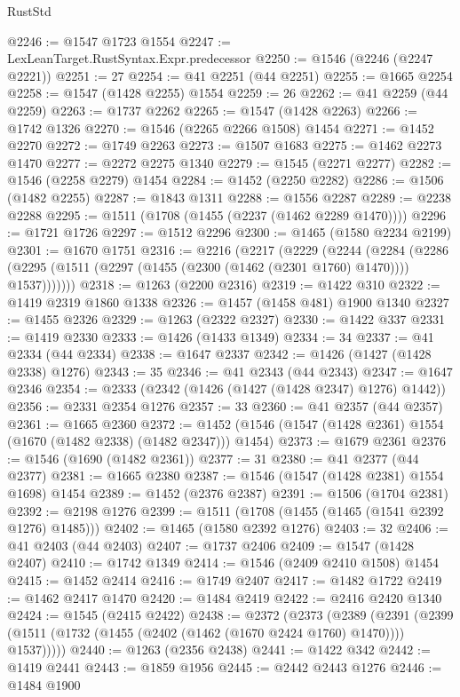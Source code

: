 \begin{lexlean}{RustStd}
\begin{coremodule}
@2246 := @1547 @1723 @1554
@2247 := LexLeanTarget.RustSyntax.Expr.predecessor
@2250 := @1546 (@2246 (@2247 @2221))
@2251 := 27
@2254 := @41 @2251 (@44 @2251)
@2255 := @1665 @2254
@2258 := @1547 (@1428 @2255) @1554
@2259 := 26
@2262 := @41 @2259 (@44 @2259)
@2263 := @1737 @2262
@2265 := @1547 (@1428 @2263)
@2266 := @1742 @1326
@2270 := @1546 (@2265 @2266 @1508) @1454
@2271 := @1452 @2270
@2272 := @1749 @2263
@2273 := @1507 @1683
@2275 := @1462 @2273 @1470
@2277 := @2272 @2275 @1340
@2279 := @1545 (@2271 @2277)
@2282 := @1546 (@2258 @2279) @1454
@2284 := @1452 (@2250 @2282)
@2286 := @1506 (@1482 @2255)
@2287 := @1843 @1311
@2288 := @1556 @2287
@2289 := @2238 @2288
@2295 := @1511 (@1708 (@1455 (@2237 (@1462 @2289 @1470))))
@2296 := @1721 @1726
@2297 := @1512 @2296
@2300 := @1465 (@1580 @2234 @2199)
@2301 := @1670 @1751
@2316 := @2216
    (@2217
      (@2229
        (@2244
          (@2284
            (@2286 (@2295 (@1511 (@2297 (@1455 (@2300 (@1462 (@2301 @1760) @1470)))) @1537)))))))
@2318 := @1263 (@2200 @2316)
@2319 := @1422 @310
@2322 := @1419 @2319 @1860 @1338
@2326 := @1457 (@1458 @481) @1900 @1340
@2327 := @1455 @2326
@2329 := @1263 (@2322 @2327)
@2330 := @1422 @337
@2331 := @1419 @2330
@2333 := @1426 (@1433 @1349)
@2334 := 34
@2337 := @41 @2334 (@44 @2334)
@2338 := @1647 @2337
@2342 := @1426 (@1427 (@1428 @2338) @1276)
@2343 := 35
@2346 := @41 @2343 (@44 @2343)
@2347 := @1647 @2346
@2354 := @2333 (@2342 (@1426 (@1427 (@1428 @2347) @1276) @1442))
@2356 := @2331 @2354 @1276
@2357 := 33
@2360 := @41 @2357 (@44 @2357)
@2361 := @1665 @2360
@2372 := @1452 (@1546 (@1547 (@1428 @2361) @1554 (@1670 (@1482 @2338) (@1482 @2347))) @1454)
@2373 := @1679 @2361
@2376 := @1546 (@1690 (@1482 @2361))
@2377 := 31
@2380 := @41 @2377 (@44 @2377)
@2381 := @1665 @2380
@2387 := @1546 (@1547 (@1428 @2381) @1554 @1698) @1454
@2389 := @1452 (@2376 @2387)
@2391 := @1506 (@1704 @2381)
@2392 := @2198 @1276
@2399 := @1511 (@1708 (@1455 (@1465 (@1541 @2392 @1276) @1485)))
@2402 := @1465 (@1580 @2392 @1276)
@2403 := 32
@2406 := @41 @2403 (@44 @2403)
@2407 := @1737 @2406
@2409 := @1547 (@1428 @2407)
@2410 := @1742 @1349
@2414 := @1546 (@2409 @2410 @1508) @1454
@2415 := @1452 @2414
@2416 := @1749 @2407
@2417 := @1482 @1722
@2419 := @1462 @2417 @1470
@2420 := @1484 @2419
@2422 := @2416 @2420 @1340
@2424 := @1545 (@2415 @2422)
@2438 := @2372
    (@2373
      (@2389
        (@2391 (@2399 (@1511 (@1732 (@1455 (@2402 (@1462 (@1670 @2424 @1760) @1470)))) @1537)))))
@2440 := @1263 (@2356 @2438)
@2441 := @1422 @342
@2442 := @1419 @2441
@2443 := @1859 @1956
@2445 := @2442 @2443 @1276
@2446 := @1484 @1900

\end{coremodule}
\end{lexlean}
